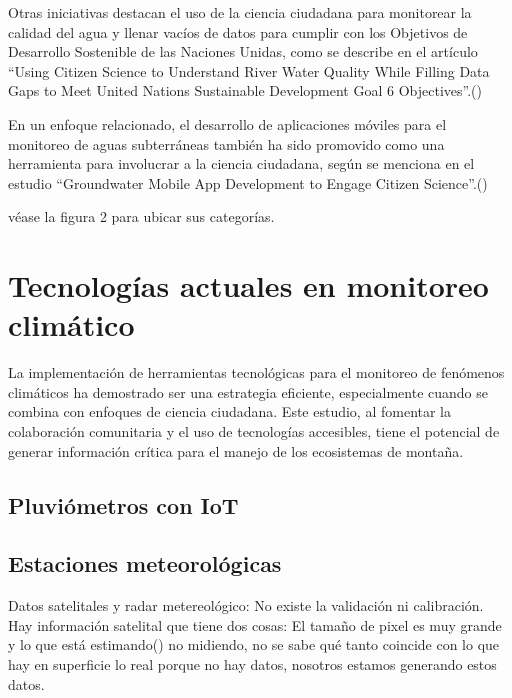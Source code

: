 Otras iniciativas destacan el uso de la ciencia ciudadana para monitorear la calidad del agua y llenar vacíos de datos para cumplir con los Objetivos de Desarrollo Sostenible de las Naciones Unidas, como se describe en el artículo “Using Citizen Science to Understand River Water Quality While Filling Data Gaps to Meet United Nations Sustainable Development Goal 6 Objectives”.(\cite{mcginn2021using})

En un enfoque relacionado, el desarrollo de aplicaciones móviles para el monitoreo de aguas subterráneas también ha sido promovido como una herramienta para involucrar a la ciencia ciudadana, según se menciona en el estudio “Groundwater Mobile App Development to Engage Citizen Science”.(\cite{dennis2019groundwater})



véase la figura 2 para ubicar sus categorías.














\section{Tecnologías actuales en monitoreo climático}
La implementación de herramientas tecnológicas para el monitoreo de fenómenos climáticos ha demostrado ser una estrategia eficiente, especialmente cuando se combina con enfoques de ciencia ciudadana. Este estudio, al fomentar la colaboración comunitaria y el uso de tecnologías accesibles, tiene el potencial de generar información crítica para el manejo de los ecosistemas de montaña.



\subsection{Pluviómetros con IoT}

\subsection{Estaciones meteorológicas}

Datos satelitales y radar metereológico: No existe la validación ni calibración. Hay información satelital que tiene dos cosas: El tamaño de pixel es muy grande y lo que está estimando() no midiendo, no se sabe qué tanto coincide con lo que hay en superficie lo real porque no hay datos, nosotros estamos generando estos datos.

